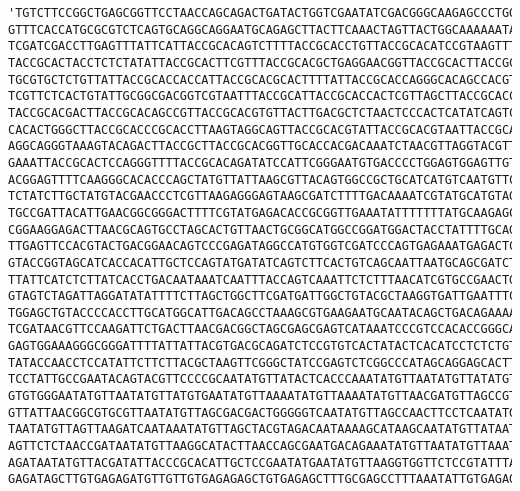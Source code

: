\documentclass[11pt]{article}
\makeatletter
\newcommand{\boxspacing}{\kern\kvtcb@left@rule\kern\kvtcb@boxsep}
\newcommand{\prompt}[4]{
        {\ttfamily\llap{{\color{#2}[#3]:\hspace{3pt}#4}}\vspace{-\baselineskip}}
    }
\makeatother
\begin{document}
            \begin{tcolorbox}[breakable, size=fbox, boxrule=.5pt, pad at break*=1mm, opacityfill=0]
\prompt{Out}{outcolor}{ }{\boxspacing}
\begin{Verbatim}[commandchars=\\\{\}]
'TGTCTTCCGGCTGAGCGGTTCCTAACCAGCAGACTGATACTGGTCGAATATCGACGGGCAAGAGCCCTGGGATTGATGC
GTTTCACCATGCGCGTCTCAGTGCAGGCAGGAATGCAGAGCTTACTTCAAACTAGTTACTGGCAAAAAATACAAATTTTT
TCGATCGACCTTGAGTTTATTCATTACCGCACAGTCTTTTACCGCACCTGTTACCGCACATCCGTAAGTTTACCGCACGT
TACCGCACTACCTCTCTATATTACCGCACTTCGTTTACCGCACGCTGAGGAACGGTTACCGCACTTACCGCACCACAAGG
TGCGTGCTCTGTTATTACCGCACCACCATTACCGCACGCACTTTTATTACCGCACCAGGGCACAGCCACGTAGGGTAGCG
TCGTTCTCACTGTATTGCGGCGACGGTCGTAATTTACCGCATTACCGCACCACTCGTTAGCTTACCGCACCTAGGGTTGT
TACCGCACGACTTACCGCACAGCCGTTACCGCACGTGTTACTTGACGCTCTAACTCCCACTCATATCAGTCTTATTACCG
CACACTGGGCTTACCGCACCCGCACCTTAAGTAGGCAGTTACCGCACGTATTACCGCACGTAATTACCGCACACCTGTAA
AGGCAGGGTAAAGTACAGACTTACCGCTTACCGCACGGTTGCACCACGACAAATCTAACGTTAGGTACGTTACCGCACGG
GAAATTACCGCACTCCAGGGTTTTACCGCACAGATATCCATTCGGGAATGTGACCCCTGGAGTGGAGTTGTGCGAAAGAT
ACGGAGTTTTCAAGGGCACACCCAGCTATGTTATTAAGCGTTACAGTGGCCGCTGCATCATGTCAATGTTCAGGTCATTC
TCTATCTTGCTATGTACGAACCCTCGTTAAGAGGGAGTAAGCGATCTTTTGACAAAATCGTATGCATGTAGGCGAGGCAA
TGCCGATTACATTGAACGGCGGGACTTTTCGTATGAGACACCGCGGTTGAAATATTTTTTTATGCAAGAGCGGGATTGGG
CGGAAGGAGACTTAACGCAGTGCCTAGCACTGTTAACTGCGGCATGGCCGGATGGACTACCTATTTTGCAGCTCCAGCGT
TTGAGTTCCACGTACTGACGGAACAGTCCCGAGATAGGCCATGTGGTCGATCCCAGTGAGAAATGAGACTCGAGATGCCG
GTACCGGTAGCATCACCACATTGCTCCAGTATGATATCAGTCTTCACTGTCAGCAATTAATGCAGCGATCTTGAAGAGAG
TTATTCATCTCTTATCACCTGACAATAAATCAATTTACCAGTCAAATTCTCTTTAACATCGTGCCGAACTGCGATGCGTC
GTAGTCTAGATTAGGATATATTTTCTTAGCTGGCTTCGATGATTGGCTGTACGCTAAGGTGATTGAATTTCGATCTGCAT
TGGAGCTGTACCCCACCTTGCATGGCATTGACAGCCTAAAGCGTGAAGAATGCAATACAGCTGACAGAAAAATAACGGGC
TCGATAACGTTCCAAGATTCTGACTTAACGACGGCTAGCGAGCGAGTCATAAATCCCGTCCACACCGGGCAATCGGGTCG
GAGTGGAAAGGGCGGGATTTTATTATTACGTGACGCAGATCTCCGTGTCACTATACTCACATCCTCTCTGTAGATAAAGT
TATACCAACCTCCATATTCTTCTTACGCTAAGTTCGGGCTATCCGAGTCTCGGCCCATAGCAGGAGCACTTTAAGGGAAG
TCCTATTGCCGAATACAGTACGTTCCCCGCAATATGTTATACTCACCCAAATATGTTAATATGTTATATGTTAAAACGCA
GTGTGGGAATATGTTAATATGTTATGTGAATATGTTAAAATATGTTAAAATATGTTAACGATGTTAGCCGTGATAAATAT
GTTATTAACGGCGTGCGTTAATATGTTAGCGACGACTGGGGGTCAATATGTTAGCCAACTTCCTCAATATGTTAACCGGT
TAATATGTTAGTTAAGATCAATAAATATGTTAGCTACGTAGACAATAAAAGCATAAGCAATATGTTATAATATGTTAGAC
AGTTCTCTAACCGATAATATGTTAAGGCATACTTAACCAGCGAATGACAGAAATATGTTAATATGTTAAATAAATATGTT
AGATAATATGTTACGATATTACCCGCACATTGCTCCGAATATGAATATGTTAAGGTGGTTCTCCGTATTTAATATTGTGA
GAGATAGCTTGTGAGAGATGTTGTTGTGAGAGAGCTGTGAGAGCTTTGCGAGCCTTTAAATATTGTGAGAGTTATGTAGT

\end{Verbatim}
\end{tcolorbox}
\end{document}
